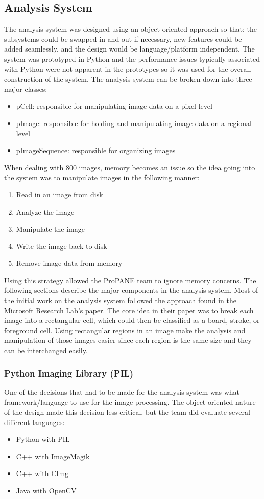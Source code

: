\documentclass[]{article}
\begin{document}
		\subsection{Analysis System}
			The analysis system was designed using an object-oriented approach so that: the subsystems could be swapped in and out if necessary, new features could be added seamlessly, and the design would be language/platform independent. The system was prototyped in Python and the performance issues typically associated with Python were not apparent in the prototypes so it was used for the overall construction of the system. The analysis system can be broken down into three major classes:
			\begin{itemize}
				\item pCell: responsible for manipulating image data on a pixel level
				\item pImage: responsible for holding and manipulating image data on a regional level
				\item pImageSequence: responsible for organizing images
			\end{itemize}
			When dealing with 800 images, memory becomes an issue so the idea going into the system was to manipulate images in the following manner:
			\begin{enumerate}
				\item Read in an image from disk
				\item Analyze the image
				\item Manipulate the image
				\item Write the image back to disk
				\item Remove image data from memory
			\end{enumerate} 
			Using this strategy allowed the ProPANE team to ignore memory concerns. The following sections describe the major components in the analysis system. Most of the initial work on the analysis system followed the approach found in the Microsoft Research Lab's paper. The core idea in their paper was to break each image into a rectangular cell, which could then be classified as a board, stroke, or foreground cell. Using rectangular regions in an image make the analysis and manipulation of those images easier since each region is the same size and they can be interchanged easily. 
			
			\subsubsection{Python Imaging Library (PIL)}
				One of the decisions that had to be made for the analysis system was what framework/language to use for the image processing. The object oriented nature of the design made this decision less critical, but the team did evaluate several different languages:
				\begin{itemize}
					\item Python with PIL
					\item C++ with ImageMagik
					\item C++ with CImg
					\item Java with OpenCV
				\end{itemize}
			
\end{document}
